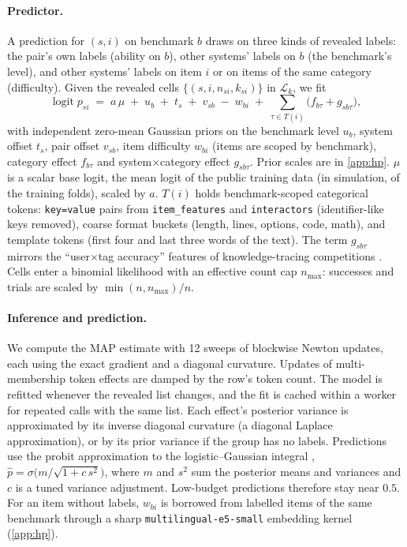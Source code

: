 \documentclass{article}
\newcommand{\Lb}{\mathcal{L}}
\DeclareMathOperator{\logit}{logit}
\begin{document}
\paragraph{Predictor.}
A prediction for $(s,i)$ on benchmark $b$ draws on three kinds of revealed labels: the pair's own labels (ability on $b$), other systems' labels on $b$ (the benchmark's level), and other systems' labels on item $i$ or on items of the same category (difficulty). Given the revealed cells $\{(s,i,n_{si},k_{si})\}$ in $\Lb_k$, we fit
\begin{equation}\label{eq:model}
  \logit p_{si} \;=\; a\,\mu \;+\; u_{b} \;+\; t_{s} \;+\; v_{sb} \;-\; w_{bi} \;+\; \sum_{\tau\in T(i)} \big(f_{b\tau} + g_{sb\tau}\big),
\end{equation}
with independent zero-mean Gaussian priors on the benchmark level $u_b$, system offset $t_s$, pair offset $v_{sb}$, item difficulty $w_{bi}$ (items are scoped by benchmark), category effect $f_{b\tau}$ and system$\times$category effect $g_{sb\tau}$. Prior scales are in \cref{app:hp}.
$\mu$ is a scalar base logit, the mean logit of the public training data (in simulation, of the training folds), scaled by $a$.
$T(i)$ holds benchmark-scoped categorical tokens: \texttt{key=value} pairs from \texttt{item\_features} and \texttt{interactors} (identifier-like keys removed), coarse format buckets (length, lines, options, code, math), and template tokens (first four and last three words of the text). The term $g_{sb\tau}$ mirrors the ``user$\times$tag accuracy'' features of knowledge-tracing competitions \citep{riiid2021,wang2021eedi}.
Cells enter a binomial likelihood with an effective count cap $n_{\max}$: successes and trials are scaled by $\min(n,n_{\max})/n$.

\paragraph{Inference and prediction.}
We compute the MAP estimate with 12 sweeps of blockwise Newton updates, each using the exact gradient and a diagonal curvature. Updates of multi-membership token effects are damped by the row's token count. The model is refitted whenever the revealed list changes, and the fit is cached within a worker for repeated calls with the same list.
Each effect's posterior variance is approximated by its inverse diagonal curvature (a diagonal Laplace approximation), or by its prior variance if the group has no labels.
Predictions use the probit approximation to the logistic--Gaussian integral \citep{mackay1992}, $\hat p=\sigma\big(m/\sqrt{1+c\,s^2}\big)$, where $m$ and $s^2$ sum the posterior means and variances and $c$ is a tuned variance adjustment. Low-budget predictions therefore stay near $0.5$.
For an item without labels, $w_{bi}$ is borrowed from labelled items of the same benchmark through a sharp \texttt{multilingual-e5-small} embedding kernel \citep{wang2024me5} (\cref{app:hp}).
\end{document}
